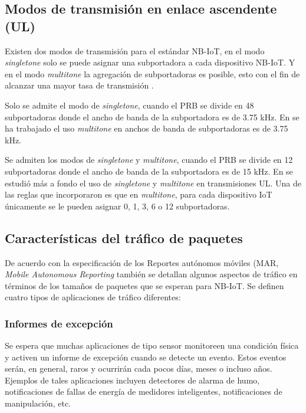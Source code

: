 \subsection{Modos de transmisión en enlace ascendente (UL) }
Existen dos modos de transmisión para el estándar NB-IoT, en el modo \textit{singletone} solo se puede asignar una subportadora a cada dispositivo NB-IoT. Y en el modo \textit{multitone} la agregación de subportadoras es posible, esto con el fin de alcanzar una mayor tasa de transmisión \parencite{RohdeNB}.\newline

Solo se admite el modo de \textit{singletone}, cuando el PRB se divide en 48 subportadoras donde el ancho de banda de la subportadora es de 3.75 kHz. En \parencite{Shahini2019} se ha trabajado el uso \textit{multitone} en anchos de banda de subportadoras es de 3.75 kHz.\newline

Se admiten los modos de \textit{singletone} y \textit{multitone}, cuando el PRB se divide en 12 subportadoras donde el ancho de banda de la subportadora es de 15 kHz. En \parencite{Mostafa2019} se estudió más a fondo el uso de \textit{singletone} y \textit{multitone} en transmisiones UL. Una de las reglas que incorporaron es que en \textit{multitone}, para cada dispositivo IoT únicamente se le pueden asignar 0, 1, 3, 6 o 12 subportadoras.

\subsection{Características del tráfico de paquetes}

De acuerdo con la especificación de los Reportes autónomos móviles (MAR, \textit{Mobile Autonomous Reporting} también se detallan algunos aspectos de tráfico en términos de los tamaños de paquetes que se esperan para NB-IoT. Se definen cuatro tipos de aplicaciones de tráfico diferentes:
\subsubsection{Informes de excepción}

Se espera que muchas aplicaciones de tipo sensor monitoreen una condición física y activen un informe de excepción cuando se detecte un evento. Estos eventos serán, en general, raros y ocurrirán cada pocos días, meses o incluso años. Ejemplos de tales aplicaciones incluyen detectores de alarma de humo, notificaciones de fallas de energía de medidores inteligentes, notificaciones de manipulación, etc.\newline

